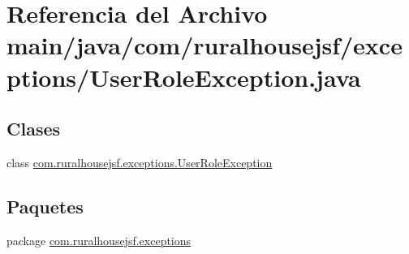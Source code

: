 \hypertarget{a00068}{}\section{Referencia del Archivo main/java/com/ruralhousejsf/exceptions/\+User\+Role\+Exception.java}
\label{a00068}
\subsection*{Clases}
\begin{DoxyCompactItemize}
\item 
class \mbox{\hyperlink{a00216}{com.\+ruralhousejsf.\+exceptions.\+User\+Role\+Exception}}
\end{DoxyCompactItemize}
\subsection*{Paquetes}
\begin{DoxyCompactItemize}
\item 
package \mbox{\hyperlink{a00118}{com.\+ruralhousejsf.\+exceptions}}
\end{DoxyCompactItemize}
